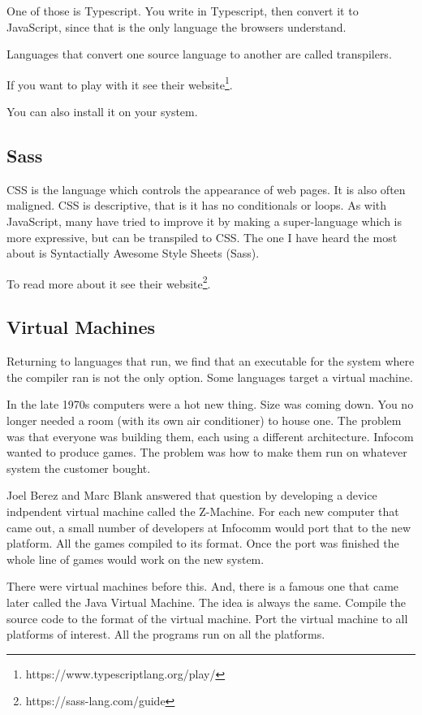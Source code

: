 One of those is Typescript. You write in Typescript, then convert
it to JavaScript, since that is the only language the browsers understand.

Languages that convert one source language to another are called transpilers.

If you want to play with it see their
website\footnote{https://www.typescriptlang.org/play/}.

You can also install it on your system.

\subsection{Sass}

CSS is the language which controls the appearance of web pages. It is
also often maligned. CSS is descriptive, that is it has no conditionals
or loops. As with JavaScript, many have tried to improve it by making
a super-language which is more expressive, but can be transpiled to CSS.
The one I have heard the most about is Syntactially Awesome Style Sheets
(Sass).

To read more about it see their
website\footnote{https://sass-lang.com/guide}.

\subsection{Virtual Machines}

Returning to languages that run, we find that an executable for the
system where the compiler ran is not the only option. Some languages
target a virtual machine.

In the late 1970s computers were a hot new thing. Size was coming down.
You no longer needed a room (with its own air conditioner) to house one.
The problem was that everyone was building them, each using a different
architecture. Infocom wanted to produce games. The problem was how to
make them run on whatever system the customer bought.

Joel Berez and Marc Blank answered that question by developing a
device indpendent virtual machine called the Z-Machine. For each new
computer that came out, a small number of developers at Infocomm
would port that to the new platform. All the games compiled to its
format. Once the port was finished the whole line of games would
work on the new system.

There were virtual machines before this. And, there is a famous one
that came later called the Java Virtual Machine. The idea is always
the same. Compile the source code to the format of the virtual machine.
Port the virtual machine to all platforms of interest. All the programs
run on all the platforms.

